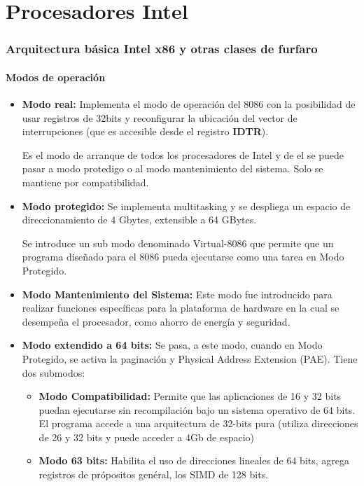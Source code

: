\part{Procesadores Intel}

\section{Arquitectura básica Intel x86 y otras clases de furfaro}

\subsection{Modos de operación}
\begin{itemize}
\item\textbf{Modo real:} Implementa el modo de operación del 8086 con la posibilidad de usar registros de 32bits y reconfigurar la ubicación del vector de interrupciones (que es accesible desde el registro \textbf{IDTR}).

Es el modo de arranque de todos los procesadores de Intel y de el se puede pasar a modo protedigo o al modo mantenimiento del sistema. Solo se mantiene por compatibilidad.

\item\textbf{Modo protegido:}
Se implementa multitasking y se despliega un espacio de direccionamiento de 4 Gbytes, extensible a 64 GBytes.

Se introduce un sub modo denominado Virtual-8086 que permite que un programa diseñado para el 8086 pueda ejecutarse
como una tarea en Modo Protegido.

\item\textbf{Modo Mantenimiento del Sistema:}
Este modo fue introducido para realizar funciones específicas para la plataforma de hardware en la cual se desempeña el procesador, como ahorro de energía y seguridad.
\item\textbf{Modo extendido a 64 bits:} Se pasa, a este modo, cuando en Modo Protegido, se activa la paginación y Physical Address Extension (PAE). Tiene dos submodos:
\begin{itemize}
\item\textbf{Modo Compatibilidad:} Permite que las aplicaciones de 16 y 32 bits puedan ejecutarse sin recompilación bajo un sistema operativo de 64 bits. El programa accede a una arquitectura de 32-bits pura (utiliza direcciones de 26 y 32 bits y puede acceder a 4Gb de espacio)

\item\textbf{Modo 63 bits:} Habilita el uso de direcciones lineales de 64 bits, agrega registros de própositos genéral, los SIMD de 128 bits.
\end{itemize}

\end{itemize}


